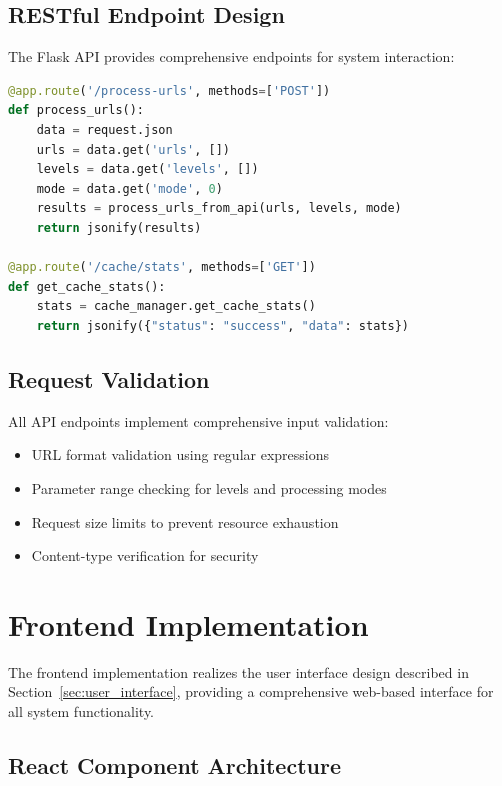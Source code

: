 \subsection{RESTful Endpoint Design}

The Flask API provides comprehensive endpoints for system interaction:

\begin{lstlisting}[language=Python]
@app.route('/process-urls', methods=['POST'])
def process_urls():
    data = request.json
    urls = data.get('urls', [])
    levels = data.get('levels', [])
    mode = data.get('mode', 0)
    results = process_urls_from_api(urls, levels, mode)
    return jsonify(results)

@app.route('/cache/stats', methods=['GET'])
def get_cache_stats():
    stats = cache_manager.get_cache_stats()
    return jsonify({"status": "success", "data": stats})
\end{lstlisting}

\subsection{Request Validation}

All API endpoints implement comprehensive input validation:

\begin{itemize}
\item URL format validation using regular expressions
\item Parameter range checking for levels and processing modes
\item Request size limits to prevent resource exhaustion
\item Content-type verification for security
\end{itemize}

\section{Frontend Implementation}
\label{sec:frontend_implementation}

The frontend implementation realizes the user interface design described in Section~\ref{sec:user_interface}, providing a comprehensive web-based interface for all system functionality.

\subsection{React Component Architecture}

